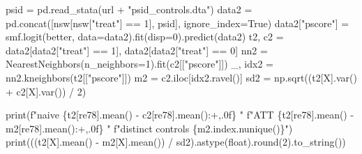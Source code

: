 \documentclass[
  letterpaper,
  10pt,
  twoside,
  openright,
  numbers=noenddot,
  chapterprefix=true]{scrbook}
\newenvironment{Shaded}{}{}
\newcommand{\BuiltInTok}[1]{\textcolor[rgb]{0.84,0.23,0.29}{#1}}
\newcommand{\DecValTok}[1]{\textcolor[rgb]{0.00,0.36,0.77}{#1}}
\newcommand{\NormalTok}[1]{\textcolor[rgb]{0.14,0.16,0.18}{#1}}
\newcommand{\OperatorTok}[1]{\textcolor[rgb]{0.14,0.16,0.18}{#1}}
\newcommand{\SpecialCharTok}[1]{\textcolor[rgb]{0.00,0.36,0.77}{#1}}
\newcommand{\SpecialStringTok}[1]{\textcolor[rgb]{0.01,0.18,0.38}{#1}}
\newcommand{\StringTok}[1]{\textcolor[rgb]{0.01,0.18,0.38}{#1}}
\newcommand{\VariableTok}[1]{\textcolor[rgb]{0.89,0.38,0.04}{#1}}
\begin{document}
\label{check-nsw-psid}
\begin{Shaded}
\begin{Highlighting}[]
\NormalTok{psid }\OperatorTok{=}\NormalTok{ pd.read\_stata(url }\OperatorTok{+} \StringTok{"psid\_controls.dta"}\NormalTok{)}
\NormalTok{data2 }\OperatorTok{=}\NormalTok{ pd.concat([nsw[nsw[}\StringTok{"treat"}\NormalTok{] }\OperatorTok{==} \DecValTok{1}\NormalTok{], psid], ignore\_index}\OperatorTok{=}\VariableTok{True}\NormalTok{)}
\NormalTok{data2[}\StringTok{"pscore"}\NormalTok{] }\OperatorTok{=}\NormalTok{ smf.logit(better, data}\OperatorTok{=}\NormalTok{data2).fit(disp}\OperatorTok{=}\DecValTok{0}\NormalTok{).predict(data2)}
\NormalTok{t2, c2 }\OperatorTok{=}\NormalTok{ data2[data2[}\StringTok{"treat"}\NormalTok{] }\OperatorTok{==} \DecValTok{1}\NormalTok{], data2[data2[}\StringTok{"treat"}\NormalTok{] }\OperatorTok{==} \DecValTok{0}\NormalTok{]}
\NormalTok{nn2 }\OperatorTok{=}\NormalTok{ NearestNeighbors(n\_neighbors}\OperatorTok{=}\DecValTok{1}\NormalTok{).fit(c2[[}\StringTok{"pscore"}\NormalTok{]])}
\NormalTok{\_, idx2 }\OperatorTok{=}\NormalTok{ nn2.kneighbors(t2[[}\StringTok{"pscore"}\NormalTok{]])}
\NormalTok{m2 }\OperatorTok{=}\NormalTok{ c2.iloc[idx2.ravel()]}
\NormalTok{sd2 }\OperatorTok{=}\NormalTok{ np.sqrt((t2[X].var() }\OperatorTok{+}\NormalTok{ c2[X].var()) }\OperatorTok{/} \DecValTok{2}\NormalTok{)}

\BuiltInTok{print}\NormalTok{(}\SpecialStringTok{f"naive }\SpecialCharTok{\{}\NormalTok{t2[}\StringTok{\textquotesingle{}re78\textquotesingle{}}\NormalTok{]}\SpecialCharTok{.}\NormalTok{mean() }\OperatorTok{{-}}\NormalTok{ c2[}\StringTok{\textquotesingle{}re78\textquotesingle{}}\NormalTok{]}\SpecialCharTok{.}\NormalTok{mean()}\SpecialCharTok{:+,.0f\}}\SpecialStringTok{   "}
      \SpecialStringTok{f"ATT }\SpecialCharTok{\{}\NormalTok{t2[}\StringTok{\textquotesingle{}re78\textquotesingle{}}\NormalTok{]}\SpecialCharTok{.}\NormalTok{mean() }\OperatorTok{{-}}\NormalTok{ m2[}\StringTok{\textquotesingle{}re78\textquotesingle{}}\NormalTok{]}\SpecialCharTok{.}\NormalTok{mean()}\SpecialCharTok{:+,.0f\}}\SpecialStringTok{   "}
      \SpecialStringTok{f"distinct controls }\SpecialCharTok{\{}\NormalTok{m2}\SpecialCharTok{.}\NormalTok{index}\SpecialCharTok{.}\NormalTok{nunique()}\SpecialCharTok{\}}\SpecialStringTok{"}\NormalTok{)}
\BuiltInTok{print}\NormalTok{(((t2[X].mean() }\OperatorTok{{-}}\NormalTok{ m2[X].mean()) }\OperatorTok{/}\NormalTok{ sd2).astype(}\BuiltInTok{float}\NormalTok{).}\BuiltInTok{round}\NormalTok{(}\DecValTok{2}\NormalTok{).to\_string())}
\end{Highlighting}
\end{Shaded}
\end{document}
